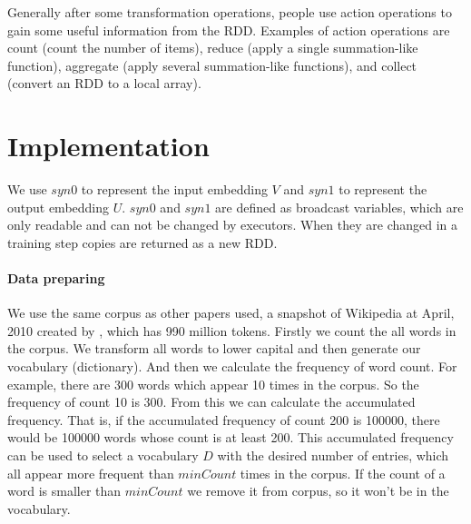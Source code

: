 Generally after some transformation operations, people use action operations to gain some useful information from the RDD. Examples of action operations are count (count the number of items), reduce (apply a single summation-like function), aggregate (apply several summation-like functions), and collect (convert an RDD to a local array). 
 


\section{Implementation}

We use $syn0$ to represent the input embedding $V$ and $syn1$ to represent the output embedding $U$. $syn0$ and $syn1$ are defined as broadcast variables, which are only readable and can not be changed by executors. When they are changed in a training step copies are returned as a new RDD.


\paragraph{Data preparing} 
We use the same corpus as other papers used, a snapshot of Wikipedia at April, 2010 created by \cite{Shaoul2010}, which has 990 million tokens. Firstly we count the all words in the corpus. We transform all words to lower capital and then generate our vocabulary (dictionary). And then we calculate the frequency of word count. For example, there are 300 words which appear 10 times in the corpus. So the frequency of count 10 is 300. From this we can calculate the accumulated frequency. That is, if the accumulated frequency of count 200 is 100000, there would be 100000 words whose count is at least 200. This accumulated frequency can be used to select a vocabulary $D$ with the desired number of entries, which all appear more frequent than $minCount$ times in the corpus.  If the count of a word is smaller than $minCount$ we remove it from corpus, so it won't be in the vocabulary.  

